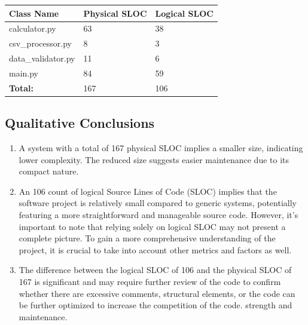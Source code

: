 \begin{enumerate}
\begin{table}[!htb]
\centering
\begin{tabular}{|l|l|l|}
\hline
\textbf{Class Name} & \textbf{Physical SLOC} & \textbf{Logical SLOC} \\
\hline
calculator.py           & 63    & 38\\
\hline
csv\_processor.py        & 8     & 3\\
\hline
data\_validator.py       & 11    & 6\\
\hline
main.py                 & 84     & 59\\
\hline
\textbf{Total:}         & 167   & 106\\
\hline
\end{tabular}
\end{table}

\end{enumerate}

\subsection{Qualitative Conclusions}

\begin{enumerate}
    \item A system with a total of 167 physical SLOC implies a smaller size, indicating lower complexity. The reduced size suggests easier maintenance due to its compact nature.
    \item An 106 count of logical Source Lines of Code (SLOC) implies that the software project is relatively small compared to generic systems, potentially featuring a more straightforward and manageable source code. However, it's important to note that relying solely on logical SLOC may not present a complete picture. To gain a more comprehensive understanding of the project, it is crucial to take into account other metrics and factors as well.
    \item The difference between the logical SLOC of 106 and the physical SLOC of 167 is significant and may require further review of the code to confirm whether there are excessive comments, structural elements, or the code can be further optimized to increase the competition of the code. strength and maintenance.
\end{enumerate}

